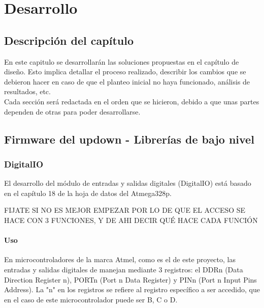 \chapter{Desarrollo}
\thispagestyle{empty}

\section{Descripción del capítulo} \label{sec:\thesection}
En este capitulo se desarrollarán las soluciones propuestas en el capítulo de diseño. Esto implica detallar el proceso realizado, describir los cambios que se debieron hacer en caso de que el planteo inicial no haya funcionado, análisis de resultados, etc. \\
Cada sección será redactada en el orden que se hicieron, debido a que unas partes dependen de otras para poder desarrollarse.

\section{Firmware del updown - Librerías de bajo nivel} \label{sec:\thesection}

\subsection{DigitalIO}
El desarrollo del módulo de entradas y salidas digitales (DigitalIO) está basado en el capítulo 18 de la hoja de datos del Atmega328p. 

\textcolor{FIXME}{FIJATE SI NO ES MEJOR EMPEZAR POR LO DE QUE EL ACCESO SE HACE CON 3 FUNCIONES, Y DE AHI DECIR QUÉ HACE CADA FUNCIÓN}

\subsubsection{Uso}
En microcontroladores de la marca Atmel, como es el de este proyecto, las entradas y salidas digitales de manejan mediante 3 registros: el DDRn (Data Direction Register n), PORTn (Port n Data Register) y PINn (Port n Input Pins Address). La "n" en los registros se refiere al registro específico a ser accedido, que en el caso de este microcontrolador puede ser B, C o D.

